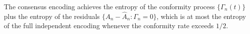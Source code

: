 \begin{proposition}
The consensus encoding achieves the entropy of the
conformity process $\{\Gamma_n(t)\}$ plus the entropy
of the residuals $\{A_n - \hat{A}_n : \Gamma_n = 0\}$,
which is at most the entropy of the full independent
encoding whenever the conformity rate exceeds $1/2$.
\end{proposition}
